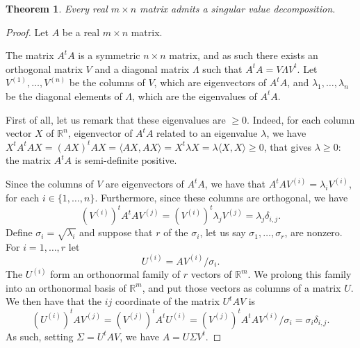 \documentclass{report}
\newtheorem{thrm}{Theorem}
\theoremstyle{definition}
\theoremstyle{remark}
\begin{document}
\bigskip
\begin{thrm}\label{svd}
        Every real $m \times n$ matrix admits a singular value decomposition.
\end{thrm}



\begin{proof}
        Let $A$ be a real $m \times n$ matrix.
        
        The matrix $A^t A$ is a symmetric $n \times n$ matrix, and as such there exists an orthogonal matrix $V$ and a diagonal matrix $\Lambda$ such that $A^t A = V\Lambda V^t$.
        Let $V^{(1)},\dots,V^{(n)}$ be the columns of $V$, which are eigenvectors of $A^tA$, and $\lambda_1,\dots,\lambda_n$ be the diagonal elements of $\Lambda$, which are the eigenvalues of $A^t A$. 
        
        First of all, let us remark that these eigenvalues are $\geq 0$. Indeed, for each column vector $X$ of $\mathbb{R}^n$, eigenvector of $A^tA$ related to an eigenvalue $\lambda$, we have $X^t A^tA X= (AX)^t AX= \langle AX, AX \rangle = X ^t\lambda X=\lambda \langle X,X\rangle \geq0$, that gives $\lambda \geq 0$: the matrix $A^tA$ is semi-definite positive.
        
        
        Since the columns of $V$ are eigenvectors of $A^tA$, we have that $A^t AV^{(i)} = \lambda_i V^{(i)}$, for each $i \in \{1,\dots,n\}$.
        Furthermore, since these columns are orthogonal, we have
        \begin{equation*}
                (V^{(i)})^t A^t A V^{(j)} = (V^{(i)})^t \lambda_j V^{(j)} = \lambda_j \delta_{i,j}.
        \end{equation*}
        Define $\sigma_i = \sqrt{\lambda_i}$ and suppose that $r$ of the $\sigma_i$, let us say $\sigma_1, \dots,\sigma _r$, are nonzero. For $i = 1,\dots, r$ let
        \begin{equation*}
                U^{(i)} = A V^{(i)}/\sigma_i.
        \end{equation*}
        The $U^{(i)} $ form an orthonormal family of $r$ vectors of  $\mathbb{R}^m$. We prolong this family into an orthonormal basis of $\mathbb{R}^m$, and put those vectors as columns of a matrix $U$.
        We then have that the $ij$ coordinate of the matrix $U^t A V$ is
        \begin{equation*}
                (U^{(i)})^t A V^{(j)}= (V^{(j)})^t A^t U^{(i)}= (V^{(j)})^t A^t A V^{(i)}/\sigma_i  = \sigma_i \delta_{i,j}. 
        \end{equation*}
        As such, setting $\Sigma=U^t A V $, we have $A = U \Sigma V^t$.
\end{proof}
\end{document}
